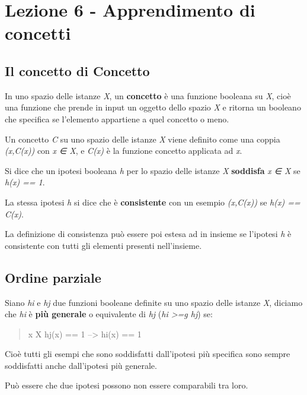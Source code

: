 \section{Lezione 6 - Apprendimento di concetti}\label{lezione-6---apprendimento-di-concetti}

\subsection{Il concetto di Concetto}\label{il-concetto-di-concetto}

In uno spazio delle istanze \emph{X}, un \textbf{concetto} è una
funzione booleana su \emph{X}, cioè una funzione che prende in input un
oggetto dello spazio \emph{X} e ritorna un booleano che specifica se
l'elemento appartiene a quel concetto o meno.

Un concetto \emph{C} su uno spazio delle istanze \emph{X} viene definito
come una coppia \emph{(x,C(x))} con \emph{x ∈ X}, e \emph{C(x)} è la
funzione concetto applicata ad \emph{x}.

Si dice che un ipotesi booleana \emph{h} per lo spazio delle istanze
\emph{X} \textbf{soddisfa} \emph{x ∈ X} se \emph{h(x) == 1}.

La stessa ipotesi \emph{h} si dice che è \textbf{consistente} con un
esempio \emph{(x,C(x))} se \emph{h(x) == C(x)}.

La definizione di consistenza può essere poi estesa ad in insieme se
l'ipotesi \emph{h} è consistente con tutti gli elementi presenti
nell'insieme.

\subsection{Ordine parziale}\label{ordine-parziale}

Siano \emph{hi} e \emph{hj} due funzioni booleane definite su uno spazio
delle istanze \emph{X}, diciamo che \emph{hi} è \textbf{più generale} o
equivalente di \emph{hj} (\emph{hi \textgreater{}=g hj}) se:

\begin{quote}
x  X \textbar{} hj(x) == 1 --\textgreater{} hi(x) == 1
\end{quote}

Cioè tutti gli esempi che sono soddisfatti dall'ipotesi più specifica
sono sempre soddisfatti anche dall'ipotesi più generale.

Può essere che due ipotesi possono non essere comparabili tra loro.

